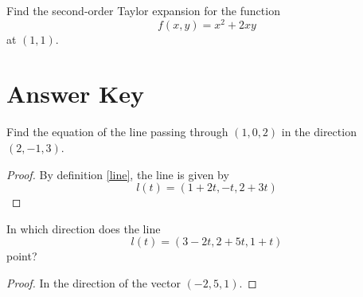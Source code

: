\documentclass[openany]{book}
\begin{document}
\begin{prob}
    Find the second-order Taylor expansion for the function 
    \begin{equation*}
        f(x,y)=x^2+2xy
    \end{equation*}
    at $(1,1)$.
\end{prob}













\chapter{Answer Key}

\begin{prob}
    Find the equation of the line passing through $(1,0,2)$ in the direction $(2,-1,3)$.
\end{prob}
\begin{proof}
    By definition \ref{line}, the line is given by 
    \begin{equation*}
        l(t)=(1+2t, -t, 2+3t)
    \end{equation*}
\end{proof}

\begin{prob}
    In which direction does the line 
    \begin{equation*}
        l(t)=(3-2t, 2+5t, 1+t)
    \end{equation*}
    point?
\end{prob}
\begin{proof}
    In the direction of the vector $(-2, 5, 1)$.
\end{proof}
\end{document}

